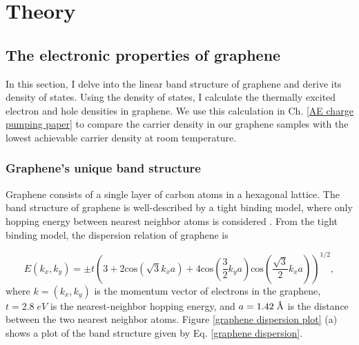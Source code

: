 \documentclass[double,12pt,1in]{beavtex}
\begin{document}
\chapter{Theory}

\section{The electronic properties of graphene}
In this section, I delve into the linear band structure of graphene and derive its density of states. Using the density of states, I calculate the thermally excited electron and hole densities in graphene. We use this calculation in Ch. \ref{AE charge pumping paper} to compare the carrier density in our graphene samples with the lowest achievable carrier density at room temperature.

\subsection{Graphene's unique band structure}

Graphene consists of a single layer of carbon atoms in a hexagonal lattice. The band structure of graphene is well-described by a tight binding model, where only hopping energy between nearest neighbor atoms is considered \cite{wallace_band_1947}. From the tight binding model, the dispersion relation of graphene is 

\begin{equation}
    E(k_x, k_y) = \pm t  \left(3 + 2\mathrm{cos}(\sqrt{3}k_x a) + 4\mathrm{cos}(\frac{3}{2}k_y a)\mathrm{cos}(\frac{\sqrt{3}}{2}k_x a)\right)^{1/2}, \label{graphene dispersion}
\end{equation}
where $k = (k_x, k_y)$ is the momentum vector of electrons in the graphene, $t = 2.8 \; eV$ is the nearest-neighbor hopping energy, and $a = 1.42 \;\SIUnitSymbolAngstrom$ is the distance between the two nearest neighbor atoms. Figure \ref{graphene dispersion plot} (a) shows a plot of the band structure given by Eq. \ref{graphene dispersion}.
\end{document}

